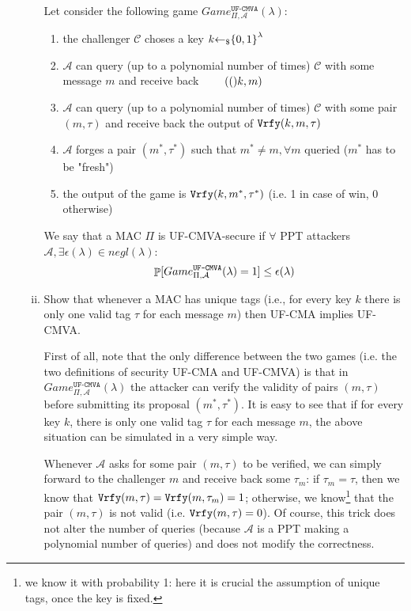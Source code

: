 \begin{enumerate}[(a)]
\begin{enumerate}[(i)]
		\begin{solution}
			Let consider the following game $Game_{\Pi, \mathcal{A}}^{\texttt{UF-CMVA}}(\lambda)$:
			\begin{enumerate}
				\item the challenger $\mathcal{C}$ choses a key $k \ud \bits^\lambda$
				\item $\mathcal{A}$ can query (up to a polynomial number of times) $\mathcal{C}$ with some message $m$ and receive back $\tag(k, m)$
				\item $\mathcal{A}$ can query (up to a polynomial number of times) $\mathcal{C}$ with some pair $(m, \tau)$ and receive back the output of $\vrfy(k, m, \tau)$
				\item $\mathcal{A}$ forges a pair $(m^*, \tau^*)$ such that $m^* \ne m, \forall m$ queried ($m^*$ has to be "fresh")
				\item the output of the game is $\vrfy(k, m^*, \tau^*)$ (i.e. 1 in case of win, 0 otherwise)
			\end{enumerate}
			We say that a MAC $\Pi$ is UF-CMVA-secure if $\forall$ PPT attackers $\mathcal{A}, \exists \epsilon(\lambda) \in negl(\lambda)$:
			\[\P[Game_{\Pi, \mathcal{A}}^{\texttt{UF-CMVA}}(\lambda) = 1] \le \epsilon(\lambda) \]
		\end{solution}
		
		\item Show that whenever a MAC has unique tags (i.e., for every key $k$ there is only one valid tag $\tau$ for each message $m$) then UF-CMA implies UF-CMVA.
		
		\begin{solution}
			First of all, note that the only difference between the two games (i.e. the two definitions of security UF-CMA and UF-CMVA) is that in $Game_{\Pi, \mathcal{A}}^{\texttt{UF-CMVA}}(\lambda)$ the attacker can verify the validity of pairs $(m, \tau)$ before submitting its proposal $(m^*, \tau^*)$.
			It is easy to see that if for every key $k$, there is only one valid tag $\tau$ for each message $m$, the above situation can be simulated in a very simple way.
			
			Whenever $\mathcal{A}$ asks for some pair $(m, \tau)$ to be verified, we can simply forward to the challenger $m$ and receive back some $\tau_m$: if $\tau_m = \tau$, then we know that $\vrfy(m, \tau) = \vrfy(m, \tau_m) = 1$; otherwise, we know\footnote{we know it with probability 1: here it is crucial the assumption of unique tags, once the key is fixed.} that the pair $(m, \tau)$ is not valid (i.e. $\vrfy(m, \tau) = 0$).
			Of course, this trick does not alter the number of queries (because $\mathcal{A}$ is a PPT making a polynomial number of queries) and does not modify the correctness.
		\end{solution}
		

\end{enumerate}
\end{enumerate}
